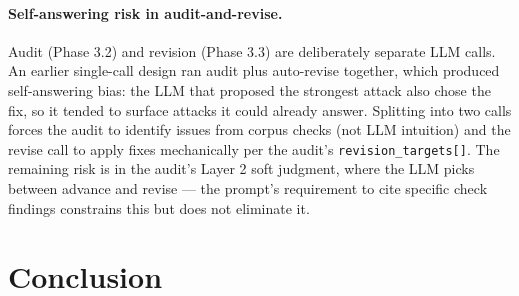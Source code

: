 \documentclass[10pt,a4paper]{article}
\begin{document}
\paragraph{Self-answering risk in audit-and-revise.} Audit (Phase 3.2) and revision (Phase 3.3) are deliberately separate LLM calls. An earlier single-call design ran audit plus auto-revise together, which produced self-answering bias: the LLM that proposed the strongest attack also chose the fix, so it tended to surface attacks it could already answer. Splitting into two calls forces the audit to identify issues from corpus checks (not LLM intuition) and the revise call to apply fixes mechanically per the audit's \texttt{revision\_targets[]}. The remaining risk is in the audit's Layer 2 soft judgment, where the LLM picks between advance and revise --- the prompt's requirement to cite specific check findings constrains this but does not eliminate it.

\section{Conclusion}
\label{sec:conclusion}
\end{document}
